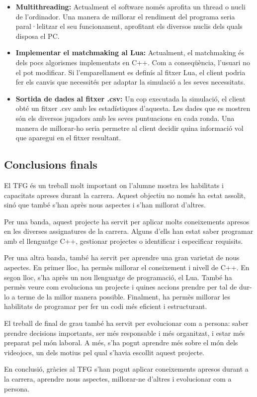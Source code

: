 \documentclass[a4paper]{article}
\begin{document}
\begin{itemize}
    \item \textbf{Multithreading:} Actualment el software només aprofita un thread o nucli de l'ordinador. Una manera de millorar el rendiment del programa seria paral·lelitzar el seu funcionament, aprofitant els diversos nuclis dels quals disposa el PC.
    
    \item \textbf{Implementar el matchmaking al Lua:} Actualment, el matchmaking és dels pocs algorismes implementats en C++. Com a conseqüència, l'usuari no el pot modificar. Si l'emparellament es definís al fitxer Lua, el client podria fer els canvis que necessités per adaptar la simulació a les seves necessitats.
    
    \item \textbf{Sortida de dades al fitxer .csv:} Un cop executada la simulació, el client obté un fitxer .csv amb les estadístiques d'aquesta. Les dades que es mostren són els diversos jugadors amb les seves puntuacions en cada ronda. Una manera de millorar-ho seria permetre al client decidir quina informació vol que aparegui en el fitxer resultant.
\end{itemize}

\subsection{Conclusions finals}

El TFG és un treball molt important on l'alumne mostra les habilitats i capacitats apreses durant la carrera. Aquest objectiu no només ha estat assolit, sinó que també s'han après nous aspectes i s'han millorat d'altres.

Per una banda, aquest projecte ha servit per aplicar molts coneixements apresos en les diverses assignatures de la carrera. Alguns d'ells han estat saber programar amb el llenguatge C++, gestionar projectes o identificar i especificar requisits.

Per una altra banda, també ha servit per aprendre una gran varietat de nous aspectes. En primer lloc, ha permès millorar el coneixement i nivell de C++. En segon lloc, s'ha après un nou llenguatge de programació, el Lua. També ha permès veure com evoluciona un projecte i quines accions prendre per tal de dur-lo a terme de la millor manera possible. Finalment, ha permès millorar les habilitats de programar per fer un codi més eficient i estructurant.

El treball de final de grau també ha servit per evolucionar com a persona: saber prendre decisions importants, ser més responsable i més organitzat, i estar més preparat pel món laboral. A més, s'ha pogut aprendre més sobre el món dels videojocs, un dels motius pel qual s'havia escollit aquest projecte.

En conclusió, gràcies al TFG s'han pogut aplicar coneixements apresos durant a la carrera, aprendre nous aspectes, millorar-ne d'altres i evolucionar com a persona.

\newpage
\nocite{*}
\printbibliography[heading=bibintoc]
\end{document}
